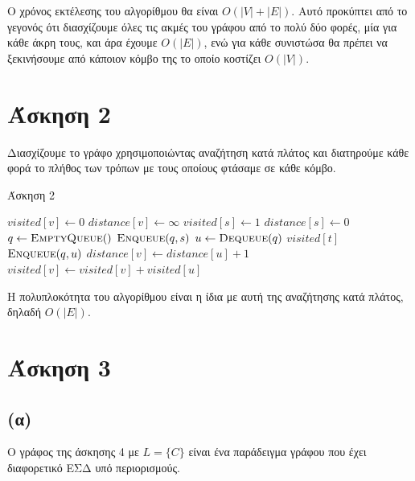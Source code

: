 \documentclass[11pt,a4paper,oneside]{report}
\begin{document}
Ο χρόνος εκτέλεσης του αλγορίθμου θα είναι $O( |V| + |E| )$. Αυτό προκύπτει από το γεγονός ότι διασχίζουμε όλες τις ακμές του γράφου από το πολύ δύο φορές, μία για κάθε άκρη τους, και άρα έχουμε $O( |E| )$, ενώ για κάθε συνιστώσα θα πρέπει να ξεκινήσουμε από κάποιον κόμβο της το οποίο κοστίζει $O( |V| )$.

\section*{Άσκηση 2}
Διασχίζουμε το γράφο χρησιμοποιώντας αναζήτηση κατά πλάτος και διατηρούμε κάθε φορά το πλήθος των τρόπων με τους οποίους φτάσαμε σε κάθε κόμβο.

\begin{algorithm}[H]	
\caption{\textgreek{Άσκηση 2}}
\begin{algorithmic}[1]

        \State $visited[ v ] \gets 0$
        \State $distance[ v ] \gets \infty$
    \EndFor
    \State $visited[ s ] \gets 1$
    \State $distance[ s ] \gets 0$
    \State $q \gets \Call{EmptyQueue}$
    \State $\Call{Enqueue}{q, s}$
        \State $u \gets \Call{Dequeue}{q}$
            \State \Return $visited[ t ]$
        \EndIf
                \State $\Call{Enqueue}{q, u}$
            \EndIf
                \State $distance[ v ] \gets distance[ u ] + 1$
                \State $visited[ v ] \gets visited[ v ] + visited[ u ]$
            \EndIf
        \EndFor
    \EndWhile
\EndProcedure
\end{algorithmic}
\end{algorithm}

Η πολυπλοκότητα του αλγορίθμου είναι η ίδια με αυτή της αναζήτησης κατά πλάτος, δηλαδή $O( |E| )$.

\section*{Άσκηση 3}
\subsection*{(α)}
Ο γράφος της άσκησης 4 με $L = \{ C \}$ είναι ένα παράδειγμα γράφου που έχει διαφορετικό ΕΣΔ υπό περιορισμούς.
\end{document}
